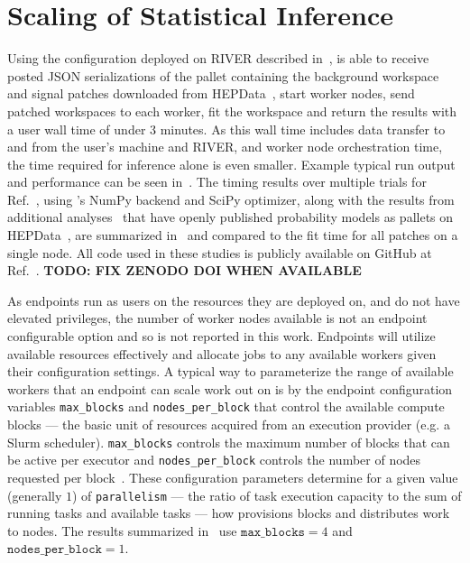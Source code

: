 \section{Scaling of Statistical Inference}\label{sec:results}
%
Using the \funcX{} configuration deployed on RIVER described in~, \funcX{} is able to receive posted JSON serializations of the \pyhf{} pallet containing the background workspace and signal patches downloaded from HEPData~\cite{ATLAS_SUSY_1Lbb_pallet}, start \funcX{} worker nodes, send patched workspaces to each worker, fit the workspace and return the results with a user wall time of under 3 minutes.
As this wall time includes data transfer to and from the user's machine and RIVER, and worker node orchestration time, the time required for inference alone is even smaller.
Example typical run output and performance can be seen in~.
The timing results over multiple trials for Ref.~\cite{ATLAS_SUSY_1Lbb_pallet}, using \pyhf{}'s NumPy backend and SciPy optimizer, along with the results from additional analyses~\cite{SUSY-2018-09,SUSY-2018-04} that have openly published probability models as \pyhf{} pallets on HEPData~\cite{ATLAS_SUSY_SS3L_pallet,ATLAS_SUSY_staus_pallet}, are summarized in~ and compared to the fit time for all patches on a single node.
All code used in these studies is publicly available on GitHub at Ref.~\cite{study_code,study_code_zenodo_doi}.
\textbf{TODO: FIX ZENODO DOI WHEN AVAILABLE}

As \funcX{} endpoints run as users on the resources they are deployed on, and do not have elevated privileges, the number of worker nodes available is not an endpoint configurable option and so is not reported in this work.
Endpoints will utilize available resources effectively and allocate jobs to any available workers given their configuration settings.
A typical way to parameterize the range of available workers that an endpoint can scale work out on is by the \funcX{} endpoint configuration variables \texttt{max\_blocks} and \texttt{nodes\_per\_block} that control the available compute blocks --- the basic unit of resources acquired from an execution provider (e.g. a Slurm scheduler).
\texttt{max\_blocks} controls the maximum number of blocks that can be active per \funcX{} executor and \texttt{nodes\_per\_block} controls the number of nodes requested per block~\cite{Parsl_paper}.
These configuration parameters determine for a given value (generally $1$) of \texttt{parallelism} --- the ratio of task execution capacity to the sum of running tasks and available tasks --- how \funcX{} provisions blocks and distributes work to nodes.
The results summarized in~ use $\texttt{max\_blocks}=4$ and $\texttt{nodes\_per\_block}=1$.

